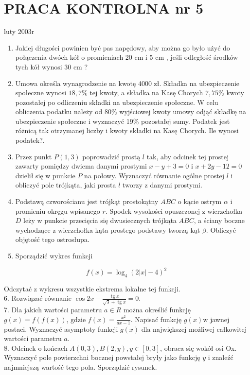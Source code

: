\documentclass[10pt]{article}
\begin{document}
\section*{PRACA KONTROLNA nr 5}
luty 2003r

\begin{enumerate}
  \item Jakiej długości powinien być pas napędowy, aby można go było użyć do połączenia dwóch kół o promieniach 20 cm i 5 cm , jeśli odległość środków tych kół wynosi 30 cm ?
  \item Umowa określa wynagrodzenie na kwotę 4000 zł. Składka na ubezpieczenie społeczne wynosi $18,7 \%$ tej kwoty, a składka na Kasę Chorych $7,75 \%$ kwoty pozostałej po odliczeniu składki na ubezpieczenie społeczne. W celu obliczenia podatku należy od $80 \%$ wyjściowej kwoty umowy odjąć składkę na ubezpieczenie społeczne i wyznaczyć 19\% pozostałej sumy. Podatek jest różnicą tak otrzymanej liczby i kwoty składki na Kasę Chorych. Ile wynosi podatek?.
  \item Przez punkt $P(1,3)$ poprowadzić prostą $l$ tak, aby odcinek tej prostej zawarty pomiędzy dwiema danymi prostymi $x-y+3=0$ i $x+2 y-12=0$ dzielił się w punkcie $P$ na połowy. Wyznaczyć równanie ogólne prostej $l$ i obliczyć pole trójkąta, jaki prosta $l$ tworzy z danymi prostymi.
  \item Podstawą czworościanu jest trójkąt prostokątny $A B C$ o kącie ostrym $\alpha$ i promieniu okręgu wpisanego $r$. Spodek wysokości opuszczonej z wierzchołka $D$ leży w punkcie przecięcia się dwusiecznych trójkąta $A B C$, a ściany boczne wychodzące z wierzchołka kąta prostego podstawy tworzą kąt $\beta$. Obliczyć objętość tego ostrosłupa.
  \item Sporządzić wykres funkcji
\end{enumerate}

$$
f(x)=\log _{4}(2|x|-4)^{2}
$$

Odczytać z wykresu wszystkie ekstrema lokalne tej funkcji.\\
6. Rozwiązać równanie $\cos 2 x+\frac{\operatorname{tg} x}{\sqrt{3}+\operatorname{tg} x}=0$.\\
7. Dla jakich wartości parametru $a \in R$ można określić funkcję $g(x)=f(f(x))$, gdzie $f(x)=\frac{x^{2}}{a x-1}$. Napisać funkcję $g(x) \mathrm{w}$ jawnej postaci. Wyznaczyć asymptoty funkcji $g(x)$ dla największej możliwej całkowitej wartości parametru $a$.\\
8. Odcinek o końcach $A(0,3), B(2, y), y \in[0,3]$, obraca się wokół osi Ox. Wyznaczyć pole powierzchni bocznej powstałej bryły jako funkcję $y$ i znaleźć najmniejszą wartość tego pola. Sporządzić rysunek.
\end{document}
